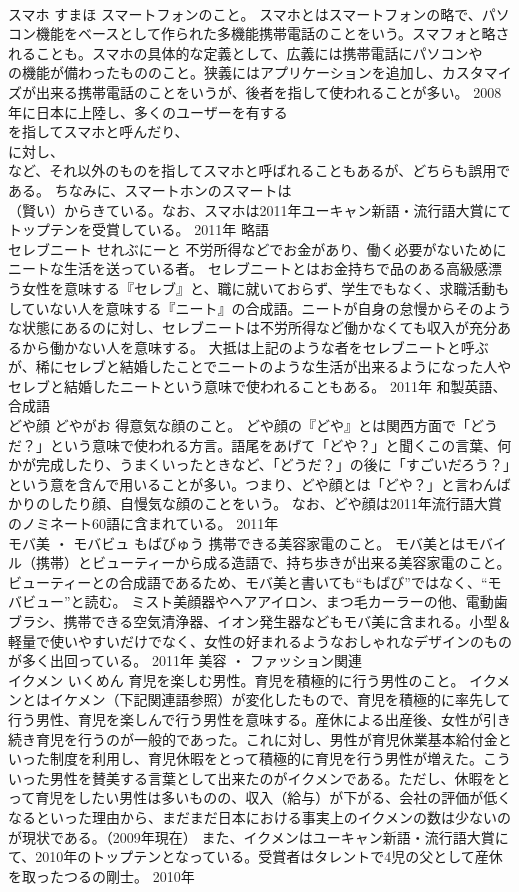 \documentclass[8pt]{extreport}
\begin{document}
\begin{CJK}{UTF8}{min}
\\	スマホ	すまほ	スマートフォンのこと。	スマホとはスマートフォンの略で、パソコン機能をベースとして作られた多機能携帯電話のことをいう。スマフォと略されることも。スマホの具体的な定義として、広義には携帯電話にパソコンや
\\	の機能が備わったもののこと。狭義にはアプリケーションを追加し、カスタマイズが出来る携帯電話のことをいうが、後者を指して使われることが多い。 2008年に日本に上陸し、多くのユーザーを有する
\\	を指してスマホと呼んだり、
\\	に対し、
\\	など、それ以外のものを指してスマホと呼ばれることもあるが、どちらも誤用である。 ちなみに、スマートホンのスマートは
\\	（賢い）からきている。なお、スマホは2011年ユーキャン新語・流行語大賞にてトップテンを受賞している。	2011年	略語	
\\	セレブニート	せれぶにーと	不労所得などでお金があり、働く必要がないためにニートな生活を送っている者。	セレブニートとはお金持ちで品のある高級感漂う女性を意味する『セレブ』と、職に就いておらず、学生でもなく、求職活動もしていない人を意味する『ニート』の合成語。ニートが自身の怠慢からそのような状態にあるのに対し、セレブニートは不労所得など働かなくても収入が充分あるから働かない人を意味する。 大抵は上記のような者をセレブニートと呼ぶが、稀にセレブと結婚したことでニートのような生活が出来るようになった人やセレブと結婚したニートという意味で使われることもある。	2011年	和製英語、合成語	
\\	どや顔	どやがお	得意気な顔のこと。	どや顔の『どや』とは関西方面で「どうだ？」という意味で使われる方言。語尾をあげて「どや？」と聞くこの言葉、何かが完成したり、うまくいったときなど、「どうだ？」の後に「すごいだろう？」という意を含んで用いることが多い。つまり、どや顔とは「どや？」と言わんばかりのしたり顔、自慢気な顔のことをいう。 なお、どや顔は2011年流行語大賞のノミネート60語に含まれている。	2011年	
\\	モバ美 ・ モバビュ	もばびゅう	携帯できる美容家電のこと。	モバ美とはモバイル（携帯）とビューティーから成る造語で、持ち歩きが出来る美容家電のこと。ビューティーとの合成語であるため、モバ美と書いても“もばび”ではなく、“モバビュー”と読む。 ミスト美顔器やヘアアイロン、まつ毛カーラーの他、電動歯ブラシ、携帯できる空気清浄器、イオン発生器などもモバ美に含まれる。小型＆軽量で使いやすいだけでなく、女性の好まれるようなおしゃれなデザインのものが多く出回っている。	2011年	美容 ・ ファッション関連	
\\	イクメン	いくめん	育児を楽しむ男性。育児を積極的に行う男性のこと。	イクメンとはイケメン（下記関連語参照）が変化したもので、育児を積極的に率先して行う男性、育児を楽しんで行う男性を意味する。産休による出産後、女性が引き続き育児を行うのが一般的であった。これに対し、男性が育児休業基本給付金といった制度を利用し、育児休暇をとって積極的に育児を行う男性が増えた。こういった男性を賛美する言葉として出来たのがイクメンである。ただし、休暇をとって育児をしたい男性は多いものの、収入（給与）が下がる、会社の評価が低くなるといった理由から、まだまだ日本における事実上のイクメンの数は少ないのが現状である。（2009年現在） また、イクメンはユーキャン新語・流行語大賞にて、2010年のトップテンとなっている。受賞者はタレントで4児の父として産休を取ったつるの剛士。	2010年	

\end{CJK}
\end{document}
